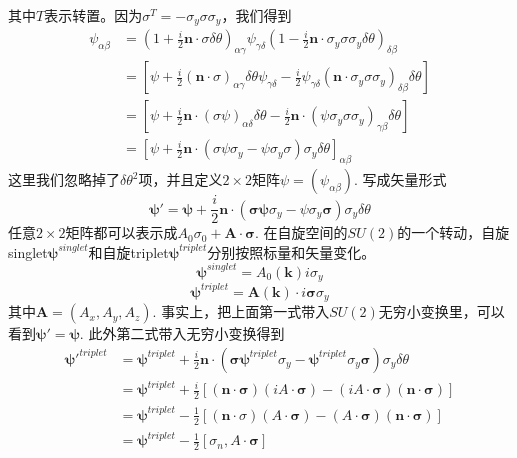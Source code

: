 \documentclass{article}
\numberwithin{equation}{subsection}
\newcommand{\mk}{\mathbf{k}}
\newcommand{\mn}{\mathbf{n}}
\newcommand{\mpsi}{\bm{\psi}}
\newcommand{\msigma}{\bm{\sigma}}
\begin{document}
其中$T$表示转置。因为$\sigma^T=-\sigma_y\sigma\sigma_y$，我们得到
\begin{equation}
    \begin{split}
        \psi_{\alpha\beta}&=\left(1+\frac{i}{2}\mn\cdot\sigma\delta\theta\right)_{\alpha\gamma}\psi_{\gamma\delta}\left(1-\frac{i}{2}\mn\cdot\sigma_y\sigma\sigma_y\delta\theta\right)_{\delta\beta}\\
        &=\left[\psi+\frac{i}{2}(\mn\cdot\sigma)_{\alpha\gamma}\delta\theta\psi_{\gamma\delta}-\frac{i}{2}\psi_{\gamma\delta}(\mn\cdot\sigma_{y}\sigma\sigma_y)_{\delta\beta}\delta\theta\right]\\
        &=\left[\psi+\frac{i}{2}\mn\cdot(\sigma\psi)_{\alpha\delta}\delta\theta-\frac{i}{2}\mn\cdot(\psi\sigma_y\sigma\sigma_y)_{\gamma\beta}\delta\theta\right]\\
        &=\left[\psi+\frac{i}{2}\mn\cdot(\sigma\psi\sigma_y-\psi\sigma_y\sigma)\sigma_y\delta\theta\right]_{\alpha\beta}
    \end{split}
\end{equation}
这里我们忽略掉了$\delta\theta^2$项，并且定义$2\times2$矩阵$\psi=(\psi_{\alpha\beta})$. 写成矢量形式
\begin{equation}
    \mpsi'=\mpsi+\frac{i}{2}\mn\cdot(\msigma\mpsi\sigma_y-\psi\sigma_y\msigma)\sigma_y\delta\theta
\end{equation}
任意$2\times 2$矩阵都可以表示成$A_0\sigma_0+\mathbf{A}\cdot\msigma$. 在自旋空间的$SU(2)$的一个转动，自旋singlet$\mpsi^{singlet}$和自旋triplet$\mpsi^{triplet}$分别按照标量和矢量变化。
\begin{equation}
    \mpsi^{singlet}=A_0(\mk)i\sigma_y
\end{equation}
\begin{equation}
    \mpsi^{triplet}=\mathbf{A}(\mk)\cdot i\msigma\sigma_y
\end{equation}
其中$\mathbf{A}=(A_x,A_y,A_z)$. 事实上，把上面第一式带入$SU(2)$无穷小变换里，可以看到$\mpsi'=\mpsi$. 此外第二式带入无穷小变换得到
\begin{equation}
    \begin{split}
        \mpsi'^{triplet}&=\mpsi^{triplet}+\frac{i}{2}\mn\cdot(\msigma\mpsi^{triplet}\sigma_y-\mpsi^{triplet}\sigma_y\msigma)\sigma_y\delta\theta\\
        &=\mpsi^{triplet}+\frac{i}{2}[(\mn\cdot\msigma)(iA\cdot\msigma)-(iA\cdot\msigma)(\mn\cdot\msigma)]\\
        &=\mpsi^{triplet}-\frac{1}{2}[(\mn\cdot\sigma)(A\cdot\msigma)-(A\cdot\msigma)(\mn\cdot\msigma)]\\
        &=\mpsi^{triplet}-\frac{1}{2}[\sigma_n,A\cdot\msigma]
    \end{split}
\end{equation}
\end{document}
